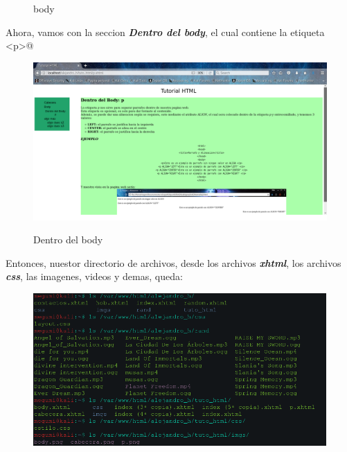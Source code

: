 \documentclass[12pt,letterpaper, spanish]{article}
\begin{document}
\begin{flushleft}
\begin{center}
\begin{figure}[h!]
\vspace{-10mm}
{\em{\caption {body}}}\label{figura 10}
\end{figure}
\end{center}
\vspace{-1cm}
\newpage
Ahora, vamos con la seccion {\bf {\em Dentro del body}}, el cual contiene la etiqueta \verb@<p>@
\vspace{-5mm}
\begin{center}
\begin{figure}[h!]
\includegraphics[scale=0.3]{./imgs/p.png}
\vspace{-10mm}
{\em{\caption {Dentro del body}}}\label{figura 11}
\end{figure}
\end{center}
\vspace{-1cm}
Entonces, nuestor directorio de archivos, desde los archivos {\bf {\em xhtml}}, los archivos {\bf {\em css}}, las imagenes, videos y demas, queda: 
\vspace{-5mm}
\begin{center}
\begin{figure}[h!]
\includegraphics[scale=0.5]{./imgs/dire.png}
\vspace{-10mm}

\end{figure}
\end{center}
\end{flushleft}
\end{document}
